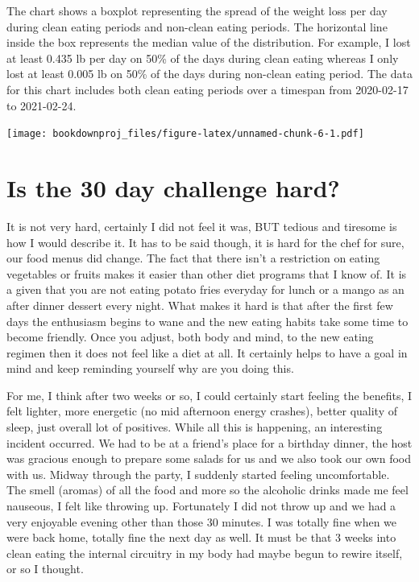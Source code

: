 \documentclass[
  oneside]{book}
\begin{document}
The chart shows a boxplot representing the spread of the weight loss per day during clean eating periods and non-clean eating periods. The horizontal line inside the box represents the median value of the distribution. For example, I lost at least 0.435 lb per day on 50\% of the days during clean eating whereas I only lost at least 0.005 lb on 50\% of the days during non-clean eating period. The data for this chart includes both clean eating periods over a timespan from 2020-02-17 to 2021-02-24.

\texttt{[image: bookdownproj\_files/figure-latex/unnamed-chunk-6-1.pdf]}

\hypertarget{is-the-30-day-challenge-hard}{%
\section{Is the 30 day challenge hard?}\label{is-the-30-day-challenge-hard}}

It is not very hard, certainly I did not feel it was, BUT tedious and tiresome is how I would describe it. It has to be said though, it is hard for the chef for sure, our food menus did change. The fact that there isn't a restriction on eating vegetables or fruits makes it easier than other diet programs that I know of. It is a given that you are not eating potato fries everyday for lunch or a mango as an after dinner dessert every night. What makes it hard is that after the first few days the enthusiasm begins to wane and the new eating habits take some time to become friendly. Once you adjust, both body and mind, to the new eating regimen then it does not feel like a diet at all. It certainly helps to have a goal in mind and keep reminding yourself why are you doing this.

For me, I think after two weeks or so, I could certainly start feeling the benefits, I felt lighter, more energetic (no mid afternoon energy crashes), better quality of sleep, just overall lot of positives. While all this is happening, an interesting incident occurred. We had to be at a friend's place for a birthday dinner, the host was gracious enough to prepare some salads for us and we also took our own food with us. Midway through the party, I suddenly started feeling uncomfortable. The smell (aromas) of all the food and more so the alcoholic drinks made me feel nauseous, I felt like throwing up. Fortunately I did not throw up and we had a very enjoyable evening other than those 30 minutes. I was totally fine when we were back home, totally fine the next day as well. It must be that 3 weeks into clean eating the internal circuitry in my body had maybe begun to rewire itself, or so I thought.
\end{document}
